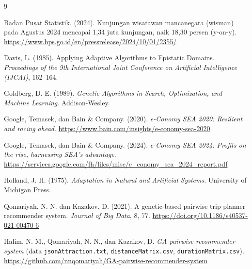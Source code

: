 \documentclass[11pt]{article}
\begin{document}
\begin{thebibliography}{9}
\setlength{\itemsep}{2pt}

Badan Pusat Statistik. (2024). Kunjungan wisatawan mancanegara (wisman) pada Agustus 2024 mencapai 1,34 juta kunjungan, naik 18,30 persen (y-on-y). \url{https://www.bps.go.id/en/pressrelease/2024/10/01/2355/}

Davis, L. (1985). Applying Adaptive Algorithms to Epistatic Domains. \textit{Proceedings of the 9th International Joint Conference on Artificial Intelligence (IJCAI)}, 162--164.

Goldberg, D. E. (1989). \textit{Genetic Algorithms in Search, Optimization, and Machine Learning}. Addison-Wesley.

Google, Temasek, dan Bain \& Company. (2020). \textit{e-Conomy SEA 2020: Resilient and racing ahead}. \url{https://www.bain.com/insights/e-conomy-sea-2020}

Google, Temasek, dan Bain \& Company. (2024). \textit{e-Conomy SEA 2024: Profits on the rise, harnessing SEA's advantage}. \url{https://services.google.com/fh/files/misc/e_conomy_sea_2024_report.pdf}

Holland, J. H. (1975). \textit{Adaptation in Natural and Artificial Systems}. University of Michigan Press.

Qomariyah, N. N. dan Kazakov, D. (2021). A genetic-based pairwise trip planner recommender system. \textit{Journal of Big Data}, 8, 77. \url{https://doi.org/10.1186/s40537-021-00470-6}

Halim, N. M., Qomariyah, N. N., dan Kazakov, D. \textit{GA-pairwise-recommender-system} (data \texttt{jsonAttraction.txt}, \texttt{distanceMatrix.csv}, \texttt{durationMatrix.csv}). \url{https://github.com/nnqomariyah/GA-pairwise-recommender-system}

\end{thebibliography}
\end{document}
